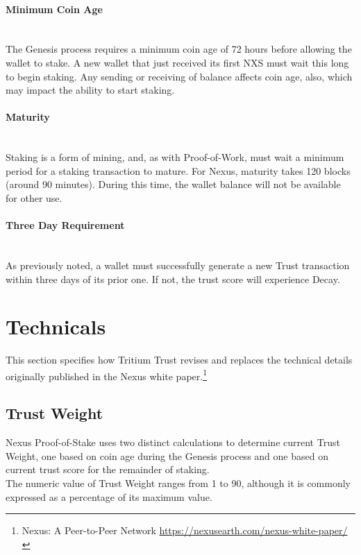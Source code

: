 \documentclass[11pt]{article}
\begin{document}
\paragraph{Minimum Coin Age} ~\\
The Genesis process requires a minimum coin age of 72 hours before allowing the wallet to stake. A new wallet that just received its first NXS must wait this long to begin staking. Any sending or receiving of balance affects coin age, also, which may impact the ability to start staking. 

\paragraph{Maturity} ~\\
Staking is a form of mining, and, as with Proof-of-Work, must wait a minimum period for a staking transaction to mature. For Nexus, maturity takes 120 blocks (around 90 minutes). During this time, the wallet balance will not be available for other use. 

\paragraph{Three Day Requirement} ~\\
As previously noted, a wallet must successfully generate a new Trust transaction within three days of its prior one. If not, the trust score will experience Decay. \\

\bigskip

\section{Technicals}
This section specifies how Tritium Trust revises and replaces the technical details originally published in the Nexus white paper.\footnote{Nexus: A Peer-to-Peer Network \url{https://nexusearth.com/nexus-white-paper/}}

\subsection{Trust Weight}
\noindent Nexus Proof-of-Stake uses two distinct calculations to determine current Trust Weight, one based on coin age during the Genesis process and one based on current trust score for the remainder of staking.\\

\noindent The numeric value of Trust Weight ranges from 1 to 90, although it is commonly expressed as a percentage of its maximum value.\\
\end{document}
